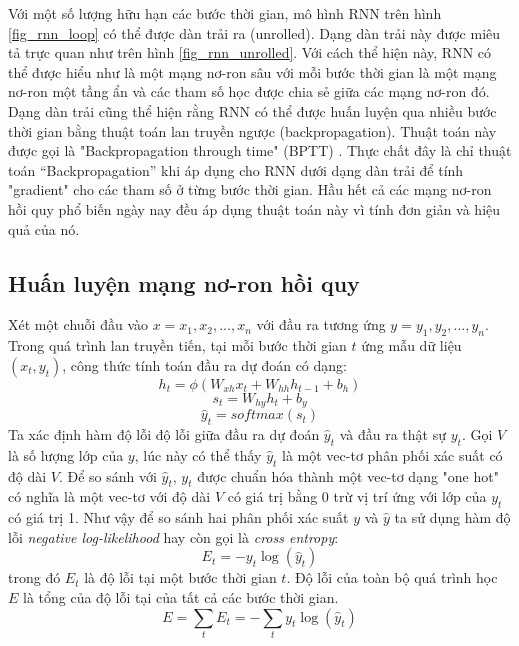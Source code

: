 Với một số lượng hữu hạn các bước thời gian, mô hình RNN trên hình \ref{fig_rnn_loop} có thể được dàn trải ra (unrolled). Dạng dàn trải này được miêu tả trực quan như trên hình \ref{fig_rnn_unrolled}. Với cách thể hiện này, RNN có thể được hiểu như là một mạng nơ-ron sâu với mỗi bước thời gian là một mạng nơ-ron một tầng ẩn và các tham số học được chia sẻ giữa các mạng nơ-ron đó. Dạng dàn trải cũng thể hiện rằng RNN có thể được huấn luyện qua nhiều bước thời gian bằng thuật toán lan truyền ngược (backpropagation). Thuật toán này được gọi là "Backpropagation through time" (BPTT) \cite{werbos1990}. Thực chất đây là chỉ thuật toán “Backpropagation” khi áp dụng cho RNN dưới dạng dàn trải để tính "gradient" cho các tham số ở từng bước thời gian. Hầu hết cả các mạng nơ-ron hồi quy phổ biến ngày nay đều áp dụng thuật toán này vì tính đơn giản và hiệu quả của nó.

\subsection{Huấn luyện mạng nơ-ron hồi quy}

Xét một chuỗi đầu vào $x={x_1,x_2,...,x_n}$ với đầu ra tương ứng $y={y_1,y_2,...,y_n}$. Trong quá trình lan truyền tiến, tại mỗi bước thời gian $t$ ứng mẫu dữ liệu $(x_t, y_t)$, công thức tính toán đầu ra dự đoán có dạng:
\begin{equation} \label{rnnForwardProp1}
	h_t = \phi \left(W_{xh} x_t + W_{hh}h_{t-1} + b_h \right) 
\end{equation}
\begin{equation} \label{rnnForwardProp2}
	s_t = W_{hy} h_t + b_y 
\end{equation}
\begin{equation} \label{rnnForwardProp3}
	\hat{y}_t = softmax (s_t) 
\end{equation}
Ta xác định hàm độ lỗi độ lỗi giữa đầu ra dự đoán $\hat{y}_t$ và đầu ra thật sự $y_t$. Gọi $V$ là số lượng lớp của $y$, lúc này có thể thấy $\hat{y}_t$ là một vec-tơ phân phối xác suất có độ dài $V$. Để so sánh với $\hat{y}_t$, $y_t$ được chuẩn hóa thành một vec-tơ dạng "one hot" có nghĩa là một vec-tơ với độ dài $V$ có giá trị bằng 0 trừ vị trí ứng với lớp của $y_t$ có giá trị 1. Như vậy để so sánh hai phân phối xác suất $y$ và $\hat{y}$ ta sử dụng hàm độ lỗi \textit{negative log-likelihood} hay còn gọi là \textit{cross entropy}:
\begin{equation} \label{errorOfAnExample}
	E_t = -y_t\log(\hat{y}_t)
\end{equation}
trong đó $E_t$ là độ lỗi tại một bước thời gian $t$. Độ lỗi của toàn bộ quá trình học $E$ là tổng của độ lỗi tại của tất cả các bước thời gian.
\begin{equation} \label{errorOfAll}
	E = \sum_{t}E_t = - \sum_{t}y_t\log(\hat{y}_t) 
\end{equation}

